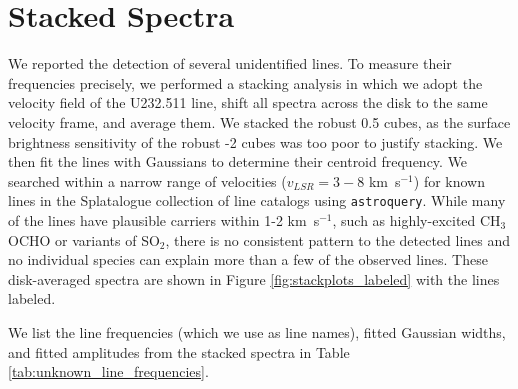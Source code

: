 \documentclass[twocolumn]{aastex61}
\newcommand{\kms}{\textrm{km~s}\ensuremath{^{-1}}\xspace}	%
\begin{document}
\section{Stacked Spectra}
\label{sec:stackedspectra}
We reported the detection of several unidentified lines.
To measure their frequencies precisely, we performed a stacking
analysis in which we adopt the velocity field of the U232.511 line,
shift all spectra across the disk to the same velocity frame, and average them.
We stacked the robust 0.5 cubes, as the surface brightness sensitivity
of the robust -2 cubes was too poor to justify stacking.
We then fit the lines with Gaussians to determine their centroid frequency.
We searched within a narrow range of velocities ($v_{LSR}=3-8$ \kms)
for known lines in the Splatalogue collection of line catalogs using
\texttt{astroquery}.
While many of the lines have plausible carriers within 1-2 \kms, such as
highly-excited CH$_3$OCHO or variants of SO$_2$, there is no consistent pattern
to the detected lines and no individual species can explain more than a few of
the observed lines.  These disk-averaged spectra are shown in Figure \ref{fig:stackplots_labeled}
with the lines labeled.

We list the line frequencies (which we use as line names), fitted Gaussian
widths, and fitted amplitudes from the stacked spectra in Table
\ref{tab:unknown_line_frequencies}.
\end{document}
